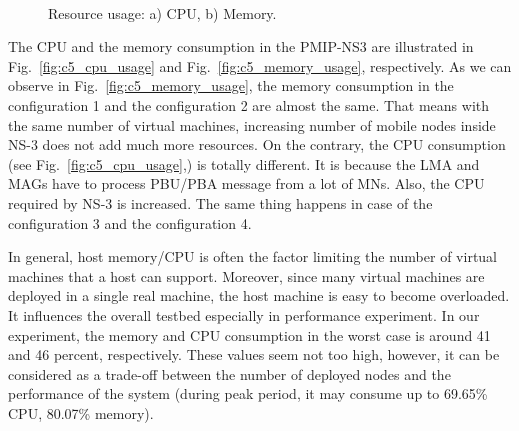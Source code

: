 \begin{figure}[h!]
\centering
{}\,
\caption[Resource usage of the near-to-real testbed.]{Resource usage: a) CPU, b) Memory.}
\label{fig:c5_resource_usage}
\end{figure}

The CPU and the memory consumption in the PMIP-NS3 are illustrated in Fig.~\ref{fig:c5_cpu_usage} and Fig.~\ref{fig:c5_memory_usage}, respectively. As we can observe in Fig.~\ref{fig:c5_memory_usage}, the memory consumption in the configuration 1 and the configuration 2 are almost the same. That means with the same number of virtual machines, increasing number of mobile nodes inside NS-3 does not add much more resources. On the contrary, the CPU consumption (see Fig.~\ref{fig:c5_cpu_usage},) is totally different. It is because the LMA and MAGs have to process PBU/PBA message from a lot of MNs. Also, the CPU required by NS-3 is increased. The same thing happens in case of the configuration 3 and the configuration 4.

In general, host memory/CPU is often the factor limiting the number of virtual machines that a host can support. Moreover, since many virtual machines are deployed in a single real machine, the host machine is easy to become overloaded. It influences the overall testbed especially in performance experiment. In our experiment, the memory and CPU consumption in the worst case is around 41 and 46 percent, respectively. These values seem not too high, however, it can be considered as a trade-off between the number of deployed nodes and the performance of the system (during peak period, it may consume up to 69.65\% CPU, 80.07\% memory). 

